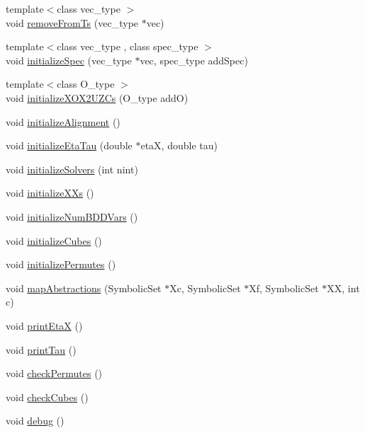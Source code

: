 \begin{DoxyCompactItemize}
{\footnotesize template$<$class vec\+\_\+type $>$ }\\void \hyperlink{classscots_1_1Adaptive_a47e3334958032965fa6218ad0c24ac02}{remove\+From\+Ts} (vec\+\_\+type $\ast$vec)
\item 
{\footnotesize template$<$class vec\+\_\+type , class spec\+\_\+type $>$ }\\void \hyperlink{classscots_1_1Adaptive_aac25a2399ed09b07ef546579c94b0726}{initialize\+Spec} (vec\+\_\+type $\ast$vec, spec\+\_\+type add\+Spec)
\item 
{\footnotesize template$<$class O\+\_\+type $>$ }\\void \hyperlink{classscots_1_1Adaptive_a1ec108254af99302f1aa0c0c97389a2b}{initialize\+X\+O\+X2\+U\+Z\+Cs} (O\+\_\+type addO)
\item 
void \hyperlink{classscots_1_1Adaptive_a8f23922cbd2768a8339c73928ddc9c5a}{initialize\+Alignment} ()
\item 
void \hyperlink{classscots_1_1Adaptive_a3dca1d73761d2678f981512dee5c325d}{initialize\+Eta\+Tau} (double $\ast$etaX, double tau)
\item 
void \hyperlink{classscots_1_1Adaptive_a25cc058f39f38402ff914ae6b927393e}{initialize\+Solvers} (int nint)
\item 
void \hyperlink{classscots_1_1Adaptive_af08ee7fae4cf6c5ae1fcabb8699e0721}{initialize\+X\+Xs} ()
\item 
void \hyperlink{classscots_1_1Adaptive_ab75f4bbed30ecc70747185f36fcab200}{initialize\+Num\+B\+D\+D\+Vars} ()
\item 
void \hyperlink{classscots_1_1Adaptive_a2b4a5e42c1a4fca883c132b02295bf11}{initialize\+Cubes} ()
\item 
void \hyperlink{classscots_1_1Adaptive_a7351461977b9be0f07ec2974531af677}{initialize\+Permutes} ()
\item 
void \hyperlink{classscots_1_1Adaptive_a5513d2aa66399f472082def1d8befced}{map\+Abstractions} (Symbolic\+Set $\ast$Xc, Symbolic\+Set $\ast$Xf, Symbolic\+Set $\ast$XX, int c)
\item 
void \hyperlink{classscots_1_1Adaptive_af192d9fee4a464e21d88b2d9735c5053}{print\+EtaX} ()
\item 
void \hyperlink{classscots_1_1Adaptive_a7e3c0b5babfb943dcda7f7f5c89cbb3e}{print\+Tau} ()
\item 
void \hyperlink{classscots_1_1Adaptive_aba179a9fad6056239005127af2e95f45}{check\+Permutes} ()
\item 
void \hyperlink{classscots_1_1Adaptive_a5e8e6dc690e2c800338fd2c866af8889}{check\+Cubes} ()
\item 
void \hyperlink{classscots_1_1Adaptive_a8ea5724cde577baf708496d6bef7e548}{debug} ()
\end{DoxyCompactItemize}
